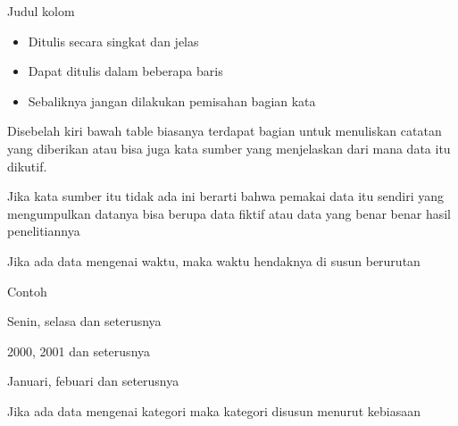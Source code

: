 \vspace{\baselineskip}
\noindent Judul kolom\par

\begin{itemize}
	\vspace{\baselineskip}
	\item Ditulis secara singkat dan jelas\par
\vspace{\baselineskip}
	\item Dapat ditulis dalam beberapa baris\par
\vspace{\baselineskip}
	\item Sebaliknya jangan dilakukan pemisahan bagian kata
\end{itemize}\par

\vspace{\baselineskip}

Disebelah kiri bawah table biasanya terdapat bagian untuk menuliskan catatan yang diberikan atau bisa juga kata sumber yang menjelaskan dari mana data itu dikutif. \par 

\vspace{\baselineskip}
Jika kata sumber itu tidak ada ini berarti bahwa pemakai data itu sendiri yang mengumpulkan datanya bisa berupa data fiktif atau data yang benar benar hasil penelitiannya\par

\vspace{\baselineskip}

 Jika ada data mengenai waktu, maka waktu hendaknya di susun berurutan\par

\vspace{\baselineskip}
\noindent Contoh\par

\vspace{\baselineskip}
Senin, selasa dan seterusnya\par
\vspace{\baselineskip}
2000, 2001 dan seterusnya\par
\vspace{\baselineskip}
Januari, febuari dan seterusnya\par

\vspace{\baselineskip}

 Jika ada data mengenai kategori maka kategori disusun menurut kebiasaan\par

